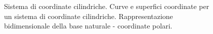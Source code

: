 \begin{figure}
\quad
{}
\caption{Sistema di coordinate cilindriche.  \protect{} Curve e superfici coordinate per un sistema di coordinate cilindriche. \protect{} Rappresentazione bidimensionale della base naturale - coordinate polari.}\label{fig:cylCoord}
\end{figure}


